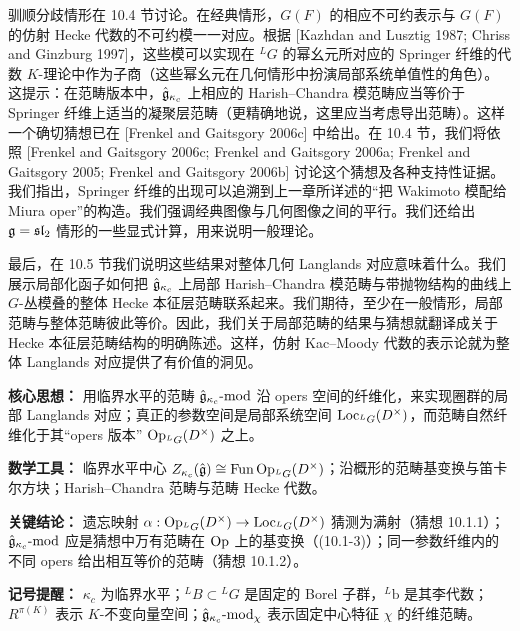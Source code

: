 驯顺分歧情形在 10.4 节讨论。在经典情形，$G(F)$ 的相应不可约表示与 $G(F)$ 的仿射 Hecke 代数的不可约模一一对应。根据 [Kazhdan and Lusztig 1987; Chriss and Ginzburg 1997]，这些模可以实现在 ${}^L G$ 的幂幺元所对应的 Springer 纤维的代数 $K$-理论中作为子商（这些幂幺元在几何情形中扮演局部系统单值性的角色）。这提示：在范畴版本中，$\hat{\mathfrak{g}}_{\kappa_c}$ 上相应的 Harish--Chandra 模范畴应当等价于 Springer 纤维上适当的凝聚层范畴（更精确地说，这里应当考虑导出范畴）。这样一个确切猜想已在 [Frenkel and Gaitsgory 2006c] 中给出。在 10.4 节，我们将依照 [Frenkel and Gaitsgory 2006c; Frenkel and Gaitsgory 2006a; Frenkel and Gaitsgory 2005; Frenkel and Gaitsgory 2006b] 讨论这个猜想及各种支持性证据。我们指出，Springer 纤维的出现可以追溯到上一章所详述的“把 Wakimoto 模配给 Miura oper”的构造。我们强调经典图像与几何图像之间的平行。我们还给出 $\mathfrak{g}=\mathfrak{sl}_2$ 情形的一些显式计算，用来说明一般理论。

最后，在 10.5 节我们说明这些结果对整体几何 Langlands 对应意味着什么。我们展示局部化函子如何把 $\hat{\mathfrak{g}}_{\kappa_c}$ 上局部 Harish--Chandra 模范畴与带抛物结构的曲线上 $G$-丛模叠的整体 Hecke 本征层范畴联系起来。我们期待，至少在一般情形，局部范畴与整体范畴彼此等价。因此，我们关于局部范畴的结果与猜想就翻译成关于 Hecke 本征层范畴结构的明确陈述。这样，仿射 Kac--Moody 代数的表示论就为整体 Langlands 对应提供了有价值的洞见。

\begin{keypoints}
    \item \textbf{核心思想：} 用临界水平的范畴 $\hat{\mathfrak{g}}_{\kappa_c}\text{-}\mathrm{mod}$ 沿 opers 空间的纤维化，来实现圈群的局部 Langlands 对应；真正的参数空间是局部系统空间 $\operatorname{Loc}_{{}^L G}(D^\times)$，而范畴自然纤维化于其“opers 版本” $\operatorname{Op}_{{}^L G}(D^\times)$ 之上。
    \item \textbf{数学工具：} 临界水平中心 $Z_{\kappa_c}(\hat{\mathfrak{g}})\cong\operatorname{Fun}\operatorname{Op}_{{}^L G}(D^\times)$；沿概形的范畴基变换与笛卡尔方块；Harish--Chandra 范畴与范畴 Hecke 代数。
    \item \textbf{关键结论：} 遗忘映射 $\alpha:\operatorname{Op}_{{}^L G}(D^\times)\to\operatorname{Loc}_{{}^L G}(D^\times)$ 猜测为满射（猜想 10.1.1）；$\hat{\mathfrak{g}}_{\kappa_c}\text{-}\mathrm{mod}$ 应是猜想中万有范畴在 $\operatorname{Op}$ 上的基变换（(10.1-3)）；同一参数纤维内的不同 opers 给出相互等价的范畴（猜想 10.1.2）。
    \item \textbf{记号提醒：} $\kappa_c$ 为临界水平；${}^L B\subset{}^L G$ 是固定的 Borel 子群，${}^L\mathrm{b}$ 是其李代数；$R^{\pi(K)}$ 表示 $K$-不变向量空间；$\hat{\mathfrak{g}}_{\kappa_c}\text{-}\mathrm{mod}_\chi$ 表示固定中心特征 $\chi$ 的纤维范畴。
\end{keypoints}

